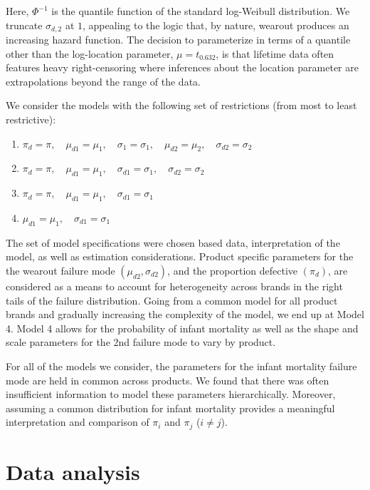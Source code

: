 \documentclass[12pt]{article}
\begin{document}
Here, $\Phi^{-1}$ is the quantile function of the standard log-Weibull distribution. We truncate $\sigma_{d,2}$ at $1$, appealing to the logic that, by nature, wearout produces an increasing hazard function. The decision to parameterize in terms of a quantile other than the log-location parameter, $\mu = t_{0.632}$, is that lifetime data often features heavy right-censoring where inferences about the location parameter are extrapolations beyond the range of the data. %

We consider the models with the following set of restrictions (from most to least restrictive):

\begin{enumerate}
\item $\pi_{d} = \pi,\quad \mu_{d1} = \mu_1,\quad \sigma_{1}=\sigma_1,\quad \mu_{d2} = \mu_2,\quad \sigma_{d2} = \sigma_2$
\item $\pi_{d} = \pi,\quad \mu_{d1} = \mu_1,\quad \sigma_{d1}=\sigma_1,\quad \sigma_{d2} = \sigma_2$
\item $\pi_{d} = \pi,\quad \mu_{d1} = \mu_1,\quad \sigma_{d1}=\sigma_1$
\item $\mu_{d1} = \mu_1,\quad \sigma_{d1}=\sigma_1$
\end{enumerate}

The set of model specifications were chosen based data, interpretation of the model, as well as estimation considerations.  Product specific parameters for the the wearout failure mode $(\mu_{d2},\sigma_{d2})$, and the proportion defective $(\pi_d)$, are considered as a means to account for heterogeneity across brands in the right tails of the failure distribution.  Going from a common model for all product brands and gradually increasing the complexity of the model, we end up at Model 4.  Model 4 allows for the probability of infant mortality as well as the shape and scale parameters for the 2nd failure mode to vary by product.

For all of the models we consider, the parameters for the infant mortality failure mode are held in common across products.  We found that there was often insufficient information to model these parameters hierarchically.  Moreover, assuming a common distribution for infant mortality provides a meaningful interpretation and comparison of $\pi_i$ and $\pi_j$ ($i \neq j$). 


\section{Data analysis}
\label{sec:Data analysis}
\end{document}
